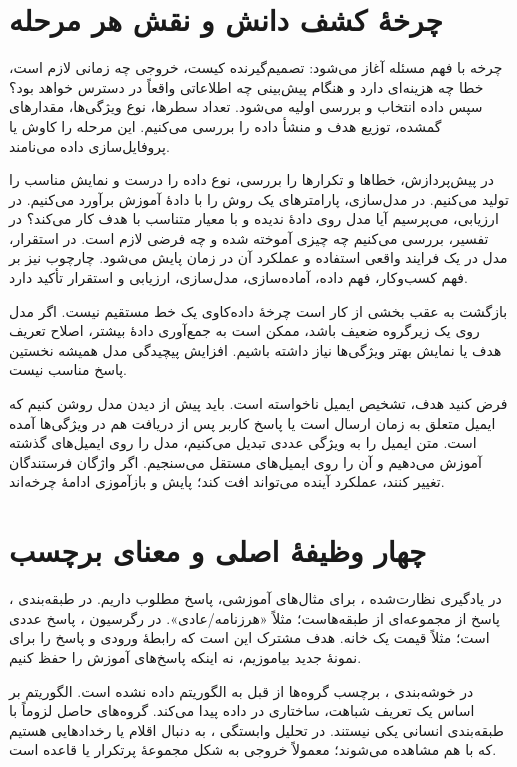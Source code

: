 \documentclass[12pt,a4paper,oneside]{report}
\begin{document}
\section{چرخهٔ کشف دانش و نقش هر مرحله}
چرخه با فهم مسئله آغاز می‌شود: تصمیم‌گیرنده کیست، خروجی چه زمانی لازم است، خطا چه هزینه‌ای دارد و هنگام پیش‌بینی چه اطلاعاتی واقعاً در دسترس خواهد بود؟ سپس داده انتخاب و بررسی اولیه می‌شود. تعداد سطرها، نوع ویژگی‌ها، مقدارهای گمشده، توزیع هدف و منشأ داده را بررسی می‌کنیم. این مرحله را کاوش یا پروفایل‌سازی داده می‌نامند.

در پیش‌پردازش، خطاها و تکرارها را بررسی، نوع داده را درست و نمایش مناسب را تولید می‌کنیم. در مدل‌سازی، پارامترهای یک روش را با دادهٔ آموزش برآورد می‌کنیم. در ارزیابی، می‌پرسیم آیا مدل روی دادهٔ ندیده و با معیار متناسب با هدف کار می‌کند؟ در تفسیر، بررسی می‌کنیم چه چیزی آموخته شده و چه فرضی لازم است. در استقرار، مدل در یک فرایند واقعی استفاده و عملکرد آن در زمان پایش می‌شود. چارچوب  نیز بر فهم کسب‌وکار، فهم داده، آماده‌سازی، مدل‌سازی، ارزیابی و استقرار تأکید دارد.

\begin{result}{بازگشت به عقب بخشی از کار است}
چرخهٔ داده‌کاوی یک خط مستقیم نیست. اگر مدل روی یک زیرگروه ضعیف باشد، ممکن است به جمع‌آوری دادهٔ بیشتر، اصلاح تعریف هدف یا نمایش بهتر ویژگی‌ها نیاز داشته باشیم. افزایش پیچیدگی مدل همیشه نخستین پاسخ مناسب نیست.
\end{result}

فرض کنید هدف، تشخیص ایمیل ناخواسته است. باید پیش از دیدن مدل روشن کنیم که ایمیل متعلق به زمان ارسال است یا پاسخ کاربر پس از دریافت هم در ویژگی‌ها آمده است. متن ایمیل را به ویژگی عددی تبدیل می‌کنیم، مدل را روی ایمیل‌های گذشته آموزش می‌دهیم و آن را روی ایمیل‌های مستقل می‌سنجیم. اگر واژگان فرستندگان تغییر کنند، عملکرد آینده می‌تواند افت کند؛ پایش و بازآموزی ادامهٔ چرخه‌اند.

\section{چهار وظیفهٔ اصلی و معنای برچسب}
در یادگیری نظارت‌شده ، برای مثال‌های آموزشی، پاسخ مطلوب داریم. در طبقه‌بندی ، پاسخ از مجموعه‌ای از طبقه‌هاست؛ مثلاً «هرزنامه/عادی». در رگرسیون ، پاسخ عددی است؛ مثلاً قیمت یک خانه. هدف مشترک این است که رابطهٔ ورودی و پاسخ را برای نمونهٔ جدید بیاموزیم، نه اینکه پاسخ‌های آموزش را حفظ کنیم.

در خوشه‌بندی ، برچسب گروه‌ها از قبل به الگوریتم داده نشده است. الگوریتم بر اساس یک تعریف شباهت، ساختاری در داده پیدا می‌کند. گروه‌های حاصل لزوماً با طبقه‌بندی انسانی یکی نیستند. در تحلیل وابستگی ، به دنبال اقلام یا رخدادهایی هستیم که با هم مشاهده می‌شوند؛ معمولاً خروجی به شکل مجموعهٔ پرتکرار یا قاعده است.
\end{document}
